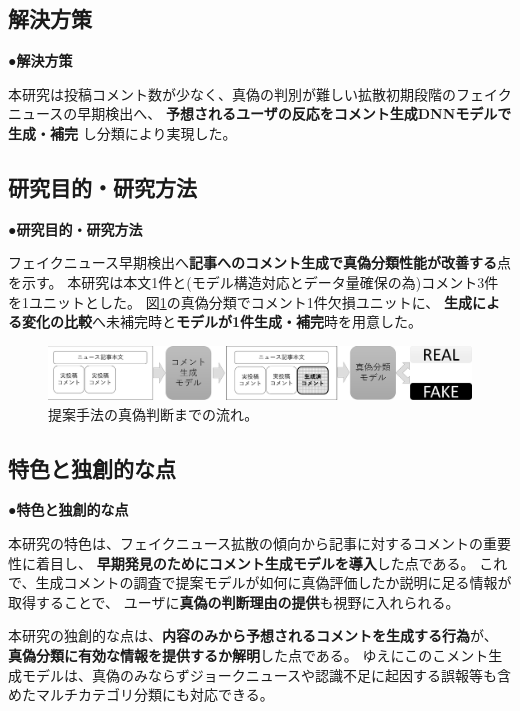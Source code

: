 {	\subsection{解決方策}
	\noindent
	●\textbf{解決方策}

	本研究は投稿コメント数が少なく、真偽の判別が難しい拡散初期段階のフェイクニュースの早期検出へ、
	\textbf{予想されるユーザの反応をコメント生成DNNモデルで生成・補完}
	し分類により実現した。

	\subsection{研究目的・研究方法}
	\noindent
	●\textbf{研究目的・研究方法}

	フェイクニュース早期検出へ\textbf{記事へのコメント生成で真偽分類性能が改善する}点を示す。
	本研究は本文1件と(モデル構造対応とデータ量確保の為)コメント3件を1ユニットとした。
	図\ref{fig:model}の真偽分類でコメント1件欠損ユニットに、
	\textbf{生成による変化の比較}へ未補完時と\textbf{モデルが1件生成・補完}時を用意した。
	
	\begin{figure}[ht]
		\centering
		\includegraphics[width=0.95\linewidth]{figs/model.pdf}
		\vspace*{-3mm}
		\caption{提案手法の真偽判断までの流れ。}
		\label{fig:model}
	\end{figure}
	\vspace*{-4mm}
	\subsection{特色と独創的な点}
	\noindent
	●\textbf{特色と独創的な点}

	本研究の特⾊は、フェイクニュース拡散の傾向から記事に対するコメントの重要性に着目し、
	\textbf{早期発⾒のためにコメント⽣成モデルを導⼊}した点である。
	これで、生成コメントの調査で提案モデルが如何に真偽評価したか説明に足る情報が取得することで、
	ユーザに\textbf{真偽の判断理由の提供}も視野に入れられる。

	本研究の独創的な点は、\textbf{内容のみから予想されるコメントを生成する行為}が、
	\textbf{真偽分類に有効な情報を提供するか解明}した点である。
	ゆえにこのこメント生成モデルは、真偽のみならずジョークニュースや認識不足に起因する誤報等も含めたマルチカテゴリ分類にも対応できる。
	
}
